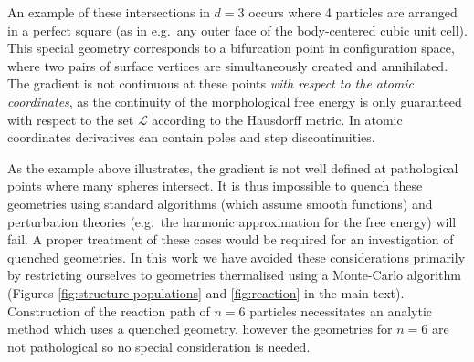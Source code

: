 An example of these intersections in $d=3$ occurs where 4 particles are arranged in a perfect square (as in e.g.\ any outer face of the body-centered cubic unit cell).
This special geometry corresponds to a bifurcation point in configuration space, where two pairs of surface vertices are simultaneously created and annihilated.
The gradient is not continuous at these points \emph{with respect to the atomic coordinates}, as the continuity of the morphological free energy is only guaranteed with respect to the set $\mathcal{L}$ according to the Hausdorff metric.
In atomic coordinates derivatives can contain poles and step discontinuities.

As the example above illustrates, the gradient is not well defined at pathological points where many spheres intersect.
It is thus impossible to quench these geometries using standard algorithms (which assume smooth functions) and perturbation theories (e.g.\ the harmonic approximation for the free energy) will fail.
A proper treatment of these cases would be required for an investigation of quenched geometries.
In this work we have avoided these considerations primarily by restricting ourselves to geometries thermalised using a Monte-Carlo algorithm (Figures \ref{fig:structure-populations} and \ref{fig:reaction} in the main text).
Construction of the reaction path of $n=6$ particles necessitates an analytic method which uses a quenched geometry, however the geometries for $n=6$ are not pathological so no special consideration is needed.
